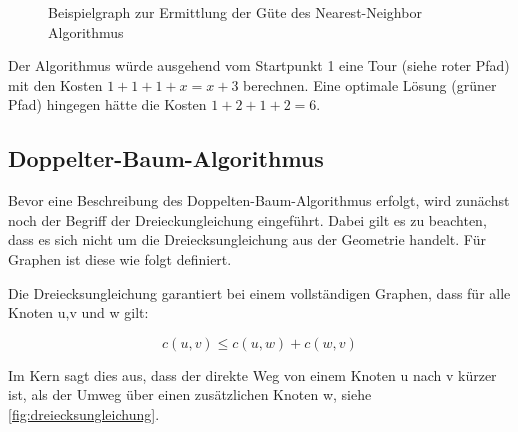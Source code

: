 \documentclass{article}
\begin{document}
\begin{figure}[H]
\centering
{}
\caption{Beispielgraph zur Ermittlung der Güte des Nearest-Neighbor Algorithmus}
\label{fig:nearest-neighbor-guete}
\end{figure}

Der Algorithmus würde ausgehend vom Startpunkt 1 eine Tour (siehe roter Pfad) mit den Kosten $1+1+1+x = x +3$ berechnen. Eine optimale Lösung (grüner Pfad) hingegen hätte die Kosten $1+2+1+2 = 6$.


\subsection{Doppelter-Baum-Algorithmus}

Bevor eine Beschreibung des Doppelten-Baum-Algorithmus erfolgt, wird zunächst noch der Begriff der Dreieckungleichung eingeführt. Dabei gilt es zu beachten, dass es sich nicht um die Dreiecksungleichung aus der Geometrie handelt. Für Graphen ist diese wie folgt definiert.

Die Dreiecksungleichung garantiert bei einem vollständigen Graphen, dass für alle Knoten u,v und w gilt:

\begin{equation}
c(u,v) \leq c(u,w) + c(w,v)
\end{equation}

Im Kern sagt dies aus, dass der direkte Weg von einem Knoten u nach v kürzer ist, als der Umweg über einen zusätzlichen Knoten w, siehe \autoref{fig:dreiecksungleichung}.
\end{document}
